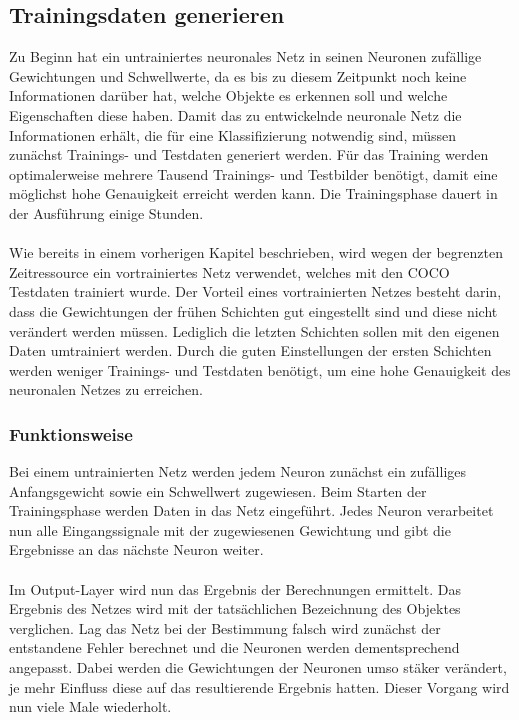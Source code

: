 \documentclass[a4paper,12pt,oneside]{article}
\begin{document}
  \subsection{Trainingsdaten generieren} 
Zu Beginn hat ein untrainiertes neuronales Netz in seinen Neuronen zufällige Gewichtungen und Schwellwerte, da es bis zu diesem Zeitpunkt noch keine Informationen darüber hat, welche Objekte es erkennen soll und welche Eigenschaften diese haben. Damit das zu entwickelnde neuronale Netz die Informationen erhält, die für eine Klassifizierung notwendig sind, müssen zunächst Trainings- und Testdaten generiert werden. Für das Training werden optimalerweise mehrere Tausend Trainings- und Testbilder benötigt, damit eine möglichst hohe Genauigkeit erreicht werden kann. Die Trainingsphase dauert in der Ausführung einige Stunden. 
\\
\\
Wie bereits in einem vorherigen Kapitel beschrieben, wird wegen der begrenzten Zeitressource ein vortrainiertes Netz verwendet, welches mit den COCO Testdaten trainiert wurde. Der Vorteil eines vortrainierten Netzes besteht darin, dass die Gewichtungen der frühen Schichten gut eingestellt sind und diese nicht verändert werden müssen. Lediglich die letzten Schichten sollen mit den eigenen Daten umtrainiert werden. Durch die guten Einstellungen der ersten Schichten werden weniger Trainings- und Testdaten benötigt, um eine hohe Genauigkeit des neuronalen Netzes zu erreichen.

  \subsubsection{Funktionsweise}
Bei einem untrainierten Netz werden jedem Neuron zunächst ein zufälliges Anfangsgewicht sowie ein Schwellwert zugewiesen. Beim Starten der Trainingsphase werden Daten in das Netz eingeführt. Jedes Neuron verarbeitet nun alle Eingangssignale mit der zugewiesenen Gewichtung und gibt die Ergebnisse an das nächste Neuron weiter. 
\\
\\
Im Output-Layer wird nun das Ergebnis der Berechnungen ermittelt. Das Ergebnis des Netzes wird mit der tatsächlichen Bezeichnung des Objektes verglichen. Lag das Netz bei der Bestimmung falsch wird zunächst der entstandene Fehler berechnet und die Neuronen werden dementsprechend angepasst. Dabei werden die Gewichtungen der Neuronen umso stäker verändert, je mehr Einfluss diese auf das resultierende Ergebnis hatten. Dieser Vorgang wird nun viele Male wiederholt. \\
  
\end{document}
